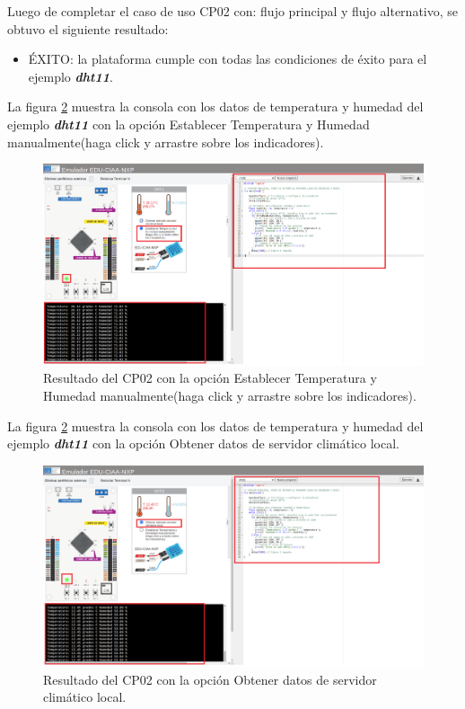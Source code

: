 Luego de completar el caso de uso CP02 con: flujo principal y flujo alternativo, se obtuvo el siguiente resultado: 

\begin{itemize}
	\item ÉXITO: la plataforma cumple con todas las condiciones de éxito para el ejemplo \textit{\textbf{dht11}}.
\end{itemize}

La figura \ref{fig:RespuestaEmulador} muestra la consola con los datos de temperatura y humedad del ejemplo \textit{\textbf{dht11}} con la opción \textquotedbl  Establecer Temperatura y Humedad manualmente(haga click y arrastre sobre
los indicadores).\textquotedbl


\begin{figure}[ht]
	\centering
	\includegraphics[scale=.20]{./Figures/dht11Opcion2.png}
	\caption{Resultado del CP02 con la opción \textquotedbl Establecer Temperatura y Humedad manualmente(haga click y arrastre sobre
los indicadores).\textquotedbl}
	\label{fig:RespuestaEmulador}
\end{figure}


La figura \ref{fig:RespuestaEmulador} muestra la consola con los datos de temperatura y humedad del ejemplo \textit{\textbf{dht11}} con la opción \textquotedbl Obtener datos de servidor climático local.\textquotedbl


\begin{figure}[ht]
	\centering
	\includegraphics[scale=.20]{./Figures/dht11Opcion1.png}
	\caption{Resultado del  CP02 con la opción \textquotedbl Obtener datos de servidor climático local.\textquotedbl}
	\label{fig:RespuestaEmulador}
\end{figure}




